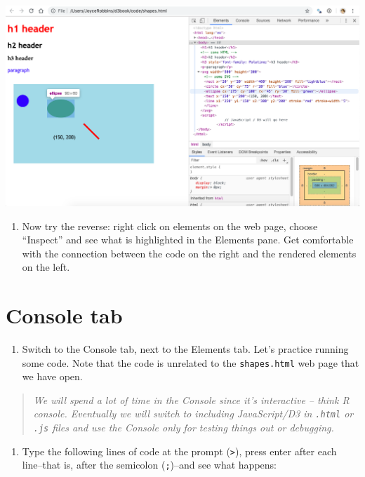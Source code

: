 \documentclass[openany]{book}
\providecommand{\tightlist}{%
  \setlength{\itemsep}{0pt}\setlength{\parskip}{0pt}}
\begin{document}
\begin{center}\includegraphics[width=0.8\linewidth]{images/elements} \end{center}

\begin{enumerate}
\def\labelenumi{\arabic{enumi}.}
\setcounter{enumi}{2}
\tightlist
\item
  Now try the reverse: right click on elements on the web page, choose ``Inspect'' and see what is highlighted in the Elements pane. Get comfortable with the connection between the code on the right and the rendered elements on the left.
\end{enumerate}

\hypertarget{console-tab}{%
\section{Console tab }\label{console-tab}}

\begin{enumerate}
\def\labelenumi{\arabic{enumi}.}
\tightlist
\item
  Switch to the Console tab, next to the Elements tab. Let's practice running some code. Note that the code is unrelated to the \texttt{shapes.html} web page that we have open.
\end{enumerate}

\begin{quote}
 \emph{We will spend a lot of time in the Console since it's interactive -- think R console. Eventually we will switch to including JavaScript/D3 in \texttt{.html} or \texttt{.js} files and use the Console only for testing things out or debugging.}
\end{quote}

\begin{enumerate}
\def\labelenumi{\arabic{enumi}.}
\setcounter{enumi}{1}
\tightlist
\item
  Type the following lines of code at the prompt (\texttt{\textgreater{}}), press enter after each line--that is, after the semicolon (\texttt{;})--and see what happens:
\end{enumerate}
\end{document}
